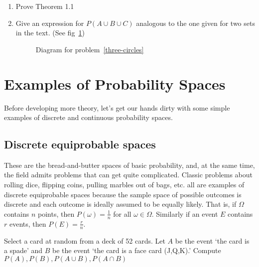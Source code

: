 \documentclass[../main.tex]{subfiles}
\begin{document}
\begin{enumerate}
	\item Prove Theorem 1.1
	
	\item \label{three-circles} Give an expression for $P(A \cup B \cup C)$ analogous
	to the one given for two sets in the text. (See fig~\ref{fig:three-circles})
	
	\begin{figure}
		\begin{center}
			\def\firstcircle{(0,0) circle (1.5cm)}
			\def\secondcircle{(60:2cm) circle (1.5cm)}
			\def\thirdcircle{(0:2cm) circle (1.5cm)}
		\end{center}
		\caption{Diagram for problem~\ref{three-circles}}
		\label{fig:three-circles}
	\end{figure}
	
\end{enumerate}

\section{Examples of Probability Spaces}
Before developing more theory, let's get our hands dirty with some simple examples of discrete and continuous probability spaces.

\subsection{Discrete equiprobable spaces}
These are the bread-and-butter spaces of basic probability, and, at the same time, the field admits problems that
can get quite complicated. Classic problems about rolling dice, flipping coins, pulling marbles out of bags, etc. all are examples
of discrete equiprobable spaces because the sample space of
possible outcomes is discrete and each outcome is ideally 
assumed to be equally likely. That is, if $\Omega$ contains
$n$ points, then $P(\omega) = \frac1n$ for all $\omega \in \Omega$.
Similarly if an event $E$ contains $r$ events, then $P(E) = \frac{r}{n}$.

\begin{example}
	Select a card at random from a deck of 52 cards. Let $A$
	be the event `the card is a spade' and $B$ be the event
	`the card is a face card (J,Q,K).' Compute $P(A), P(B),
	P(A \cup B), P(A \cap B)$
\end{example}
\end{document}
